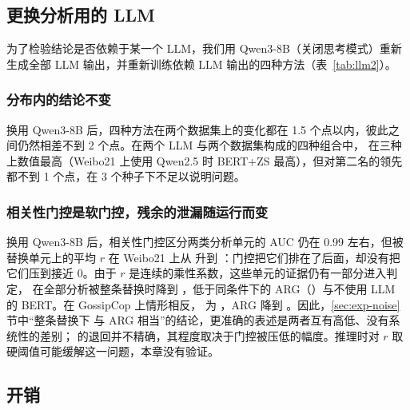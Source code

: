 \subsection{更换分析用的 LLM}\label{sec:exp-llm2}

\begin{table}[htbp]
\centering\footnotesize
\setlength{\tabcolsep}{3.6pt}
\caption{更换分析用 LLM 后的 macro-F1（\%）}\label{tab:llm2}
\end{table}

为了检验结论是否依赖于某一个 LLM，我们用 Qwen3-8B（关闭思考模式）重新生成全部 LLM 输出，并重新训练依赖 LLM 输出的四种方法（表~\ref{tab:llm2}）。

\subsubsection{分布内的结论不变}
换用 Qwen3-8B 后，四种方法在两个数据集上的变化都在 1.5 个点以内，彼此之间仍然相差不到 2 个点。在两个 LLM 与两个数据集构成的四种组合中，\method{} 在三种上数值最高（Weibo21 上使用 Qwen2.5 时 BERT+ZS 最高），但对第二名的领先都不到 1 个点，在 3 个种子下不足以说明问题。

\subsubsection{相关性门控是软门控，残余的泄漏随运行而变}
换用 Qwen3-8B 后，相关性门控区分两类分析单元的 AUC 仍在 0.99 左右，但被替换单元上的平均 $r$ 在 Weibo21 上从  升到 ：门控把它们排在了后面，却没有把它们压到接近 0。由于 $r$ 是连续的乘性系数，这些单元的证据仍有一部分进入判定，\method{} 在全部分析被整条替换时降到 ，低于同条件下的 ARG（）与不使用 LLM 的 BERT。在 GossipCop 上情形相反，\method{} 为 ，ARG 降到 。因此，\ref{sec:exp-noise} 节中“整条替换下 \method{} 与 ARG 相当”的结论，更准确的表述是两者互有高低、没有系统性的差别；\method{} 的退回并不精确，其程度取决于门控被压低的幅度。推理时对 $r$ 取硬阈值可能缓解这一问题，本章没有验证。

\subsection{开销}\label{sec:exp-cost}

